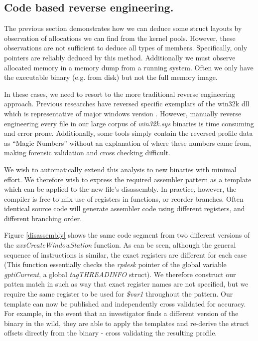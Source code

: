 \subsection{Code based reverse engineering.}
The previous section demonstrates how we can deduce some struct layouts by
observation of allocations we can find from the kernel pools. However, these
observations are not sufficient to deduce all types of members. Specifically,
only pointers are reliably deduced by this method. Additionally we must observe
allocated memory in a memory dump from a running system. Often we only have the
executable binary (e.g. from disk) but not the full memory image.

In these cases, we need to resort to the more traditional reverse engineering
approach.  Previous researches have reversed specific exemplars of the win32k
dll which is representative of major windows version
\citep{volatility}. However, manually reverse engineering every file in our
large corpus of {\em win32k.sys} binaries is time consuming and error
prone. Additionally, some tools simply contain the reversed profile data as
``Magic Numbers'' \citep{volatility} without an explanation of where these numbers
came from, making forensic validation and cross checking difficult.

We wish to automatically extend this analysis to new binaries with minimal
effort. We therefore wish to express the required assembler pattern as a
template which can be applied to the new file's disassembly. In practice,
however, the compiler is free to mix use of registers in functions, or reorder
branches. Often identical source code will generate assembler code using
different registers, and different branching order.

Figure \ref{disassembly} shows the same code segment from two different versions
of the {\em xxxCreateWindowStation} function. As can be seen, although the
general sequence of instructions is similar, the exact registers are different
for each case (This function essentially checks the {\em rpdesk} pointer of the
global variable {\em gptiCurrent}, a global {\em tagTHREADINFO} struct). We
therefore construct our patten match in such as way that exact register names
are not specified, but we require the same register to be used for {\em \$var1}
throughout the pattern. Our template can now be published and independently
cross validated for accuracy. For example, in the event that an investigator
finds a different version of the binary in the wild, they are able to apply the
templates and re-derive the struct offsets directly from the binary - cross
validating the resulting profile.

